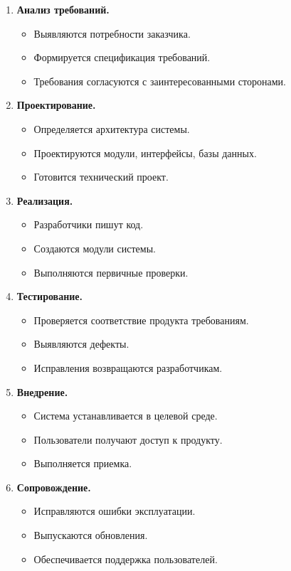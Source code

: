 \documentclass[12pt,a4paper]{article}
\begin{document}
\begin{enumerate}
    \item \textbf{Анализ требований.}
    \begin{itemize}
        \item Выявляются потребности заказчика.
        \item Формируется спецификация требований.
        \item Требования согласуются с заинтересованными сторонами.
    \end{itemize}

    \item \textbf{Проектирование.}
    \begin{itemize}
        \item Определяется архитектура системы.
        \item Проектируются модули, интерфейсы, базы данных.
        \item Готовится технический проект.
    \end{itemize}

    \item \textbf{Реализация.}
    \begin{itemize}
        \item Разработчики пишут код.
        \item Создаются модули системы.
        \item Выполняются первичные проверки.
    \end{itemize}

    \item \textbf{Тестирование.}
    \begin{itemize}
        \item Проверяется соответствие продукта требованиям.
        \item Выявляются дефекты.
        \item Исправления возвращаются разработчикам.
    \end{itemize}

    \item \textbf{Внедрение.}
    \begin{itemize}
        \item Система устанавливается в целевой среде.
        \item Пользователи получают доступ к продукту.
        \item Выполняется приемка.
    \end{itemize}

    \item \textbf{Сопровождение.}
    \begin{itemize}
        \item Исправляются ошибки эксплуатации.
        \item Выпускаются обновления.
        \item Обеспечивается поддержка пользователей.
    \end{itemize}
\end{enumerate}
\end{document}
